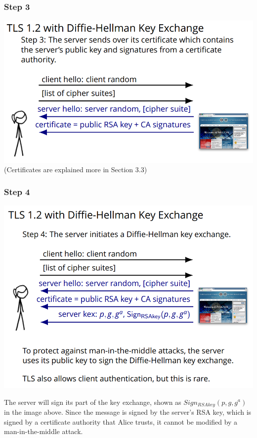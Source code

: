 \documentclass[11pt]{article} %
\begin{document}
{\subsubsection{Step 3}

\begin{center}
	\includegraphics[scale=.8]{./DiffieStep3.png}
	\\(Certificates are explained more in Section 3.3)
\end{center}

\subsubsection{Step 4}

\begin{center}
	\includegraphics[scale=.8]{./DiffieStep4.png}
\end{center}

 \noindent The server will sign its part of the key exchange, shown as 
 $Sign_{RSAkey}(p,g,g^a)$ in the image above. Since the message is signed by 
 the server's RSA key, which is signed by a certificate authority that Alice 
 trusts, it cannot be modified by a man-in-the-middle attack.

}
\end{document}
